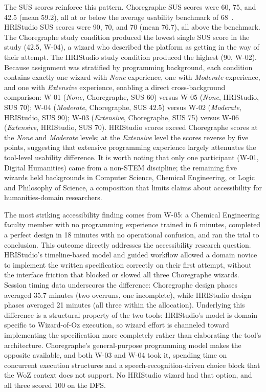 The SUS scores reinforce this pattern. Choregraphe SUS scores were 60, 75, and 42.5 (mean 59.2), all at or below the average usability benchmark of 68~\cite{Brooke1996}. HRIStudio SUS scores were 90, 70, and 70 (mean 76.7), all above the benchmark. The Choregraphe study condition produced the lowest single SUS score in the study (42.5, W-04), a wizard who described the platform as getting in the way of their attempt. The HRIStudio study condition produced the highest (90, W-02). Because assignment was stratified by programming background, each condition contains exactly one wizard with \emph{None} experience, one with \emph{Moderate} experience, and one with \emph{Extensive} experience, enabling a direct cross-background comparison: W-01 (\emph{None}, Choregraphe, SUS 60) versus W-05 (\emph{None}, HRIStudio, SUS 70); W-04 (\emph{Moderate}, Choregraphe, SUS 42.5) versus W-02 (\emph{Moderate}, HRIStudio, SUS 90); W-03 (\emph{Extensive}, Choregraphe, SUS 75) versus W-06 (\emph{Extensive}, HRIStudio, SUS 70). HRIStudio scores exceed Choregraphe scores at the \emph{None} and \emph{Moderate} levels; at the \emph{Extensive} level the scores reverse by five points, suggesting that extensive programming experience largely attenuates the tool-level usability difference. It is worth noting that only one participant (W-01, Digital Humanities) came from a non-STEM discipline; the remaining five wizards held backgrounds in Computer Science, Chemical Engineering, or Logic and Philosophy of Science, a composition that limits claims about accessibility for humanities-domain researchers.

The most striking accessibility finding comes from W-05: a Chemical Engineering faculty member with no programming experience trained in 6 minutes, completed a perfect design in 18 minutes with no operational confusion, and ran the trial to conclusion. This outcome directly addresses the accessibility research question. HRIStudio's timeline-based model and guided workflow allowed a domain novice to implement the written specification correctly on their first attempt, without the interface friction that blocked or slowed all three Choregraphe wizards. Session timing data underscores the difference: Choregraphe design phases averaged 35.7 minutes (two overruns, one incomplete), while HRIStudio design phases averaged 21 minutes (all three within the allocation). Underlying this difference is a structural property of the two tools: HRIStudio's model is domain-specific to Wizard-of-Oz execution, so wizard effort is channeled toward implementing the specification more completely rather than elaborating the tool's architecture. Choregraphe's general-purpose programming model makes the opposite available, and both W-03 and W-04 took it, spending time on concurrent execution structures and a speech-recognition-driven choice block that the WoZ context does not support. No HRIStudio wizard had that option, and all three scored 100 on the DFS.

